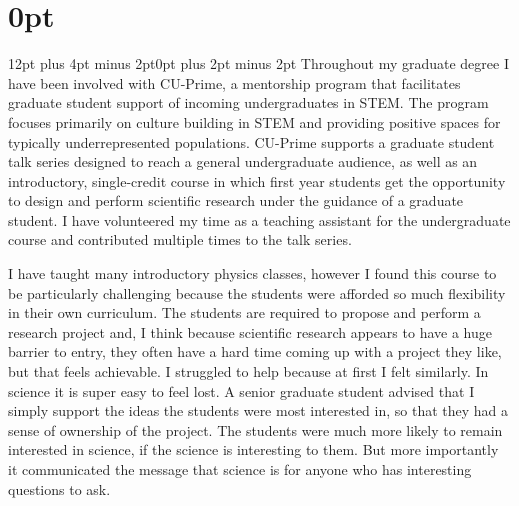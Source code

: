 \documentclass[12pt]{article}
\author{}
\date{}
\begin{document}
\pagestyle{fancy}
\thispagestyle{fancy}
\fancyhf{} %
\fancyhead[L]{\textcolor{red}{Tobias Oliver\\
Contributions Towards Building a Diverse and Inclusive Field}}
\fancyfoot[R]{\thepage}
\titlespacing\section{0pt}{12pt plus 4pt minus 2pt}{0pt plus 2pt minus 2pt}
Throughout my graduate degree I have been involved with CU-Prime, a mentorship program that facilitates graduate student support of incoming undergraduates in STEM. 
The program focuses primarily on culture building in STEM and providing positive spaces for typically underrepresented populations\cite{cup}.
CU-Prime supports a graduate student talk series designed to reach a general undergraduate audience, as well as an introductory, single-credit course in which first year students get the opportunity to design and perform scientific research under the guidance of a graduate student. 
I have volunteered my time as a teaching assistant for the undergraduate course and contributed multiple times to the talk series. 

I have taught many introductory physics classes,
however I found this course to be particularly challenging because the students were afforded so much flexibility in their own curriculum.
The students are required to propose and perform a research project and, I think because scientific research appears to have a huge barrier to entry, they often have a hard time coming up with a project they like, but that feels achievable. 
I struggled to help because at first I felt similarly. In science it is super easy to feel lost.
A senior graduate student advised that I simply support the ideas the students were most interested in, so that they had a sense of ownership of the project.
The students were much more likely to remain interested in science, if the science is interesting to them. 
But more importantly it communicated the message that science is for anyone who has interesting questions to ask.
\end{document}
